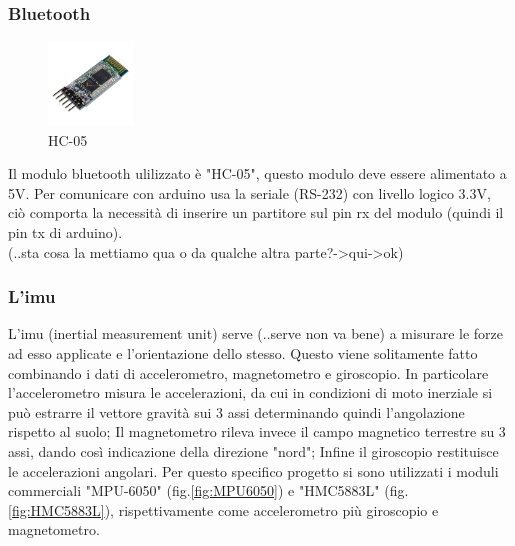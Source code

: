 \documentclass[10pt,a4paper]{article}
\begin{document}
\vspace{10pt}

\subsubsection{Bluetooth}
\begin{figure}
	\centering
	\vspace{-30pt}
	\includegraphics[width=0.2\textwidth]{HC-05.jpg}
	\vspace{-30pt}
	\caption{HC-05}
	\label{fig:HC-05}
	\vspace{-30pt}
\end{figure}
Il modulo bluetooth ulilizzato \`e "HC-05", questo modulo deve essere alimentato a 5V. Per comunicare con arduino usa la seriale (RS-232) con livello logico 3.3V, ci\`o comporta la necessit\`a di inserire un partitore sul pin rx del modulo (quindi il pin tx di arduino).
\\
(..sta cosa la mettiamo qua o da qualche altra parte?->qui->ok)

\hfill \break
\hfill \break
\hfill \break


\subsubsection{L'imu}

L'imu (inertial measurement unit) serve (..serve non va bene) a misurare le forze ad esso applicate e l'orientazione dello stesso. Questo viene solitamente fatto combinando i dati di accelerometro, magnetometro e giroscopio. In particolare l'accelerometro misura le accelerazioni, da cui in condizioni di moto inerziale si pu\`o estrarre il vettore gravit\`a sui 3 assi determinando quindi l'angolazione rispetto al suolo; Il magnetometro rileva invece il campo magnetico terrestre su 3 assi, dando cos\`i indicazione della direzione "nord"; Infine il giroscopio restituisce le accelerazioni angolari.
Per questo specifico progetto si sono utilizzati i moduli commerciali "MPU-6050" (fig.\ref{fig:MPU6050}) e "HMC5883L" (fig.\ref{fig:HMC5883L}), rispettivamente come accelerometro pi\`u giroscopio e magnetometro. 
\end{document}
